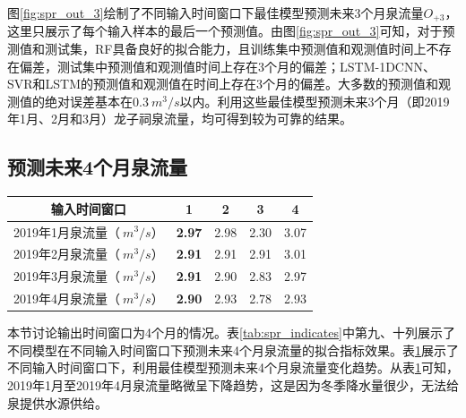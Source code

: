 图\ref{fig:spr_out_3}绘制了不同输入时间窗口下最佳模型预测未来3个月泉流量$O_{+3}$，这里只展示了每个输入样本的最后一个预测值。由图\ref{fig:spr_out_3}可知，对于预测值和测试集，RF具备良好的拟合能力，且训练集中预测值和观测值时间上不存在偏差，测试集中预测值和观测值时间上存在3个月的偏差；LSTM-1DCNN、SVR和LSTM的预测值和观测值在时间上存在3个月的偏差。大多数的预测值和观测值的绝对误差基本在$\SI{0.3}{m^{3}/s}$以内。利用这些最佳模型预测未来3个月（即2019年1月、2月和3月）龙子祠泉流量，均可得到较为可靠的结果。

\subsection{预测未来4个月泉流量}\label{sec:spr_four}

\begin{table}[!htbp]
  \centering
  \label{tab:spr_four}
  \footnotesize
  \begin{tabular}{ccccc}
    \toprule
    输入时间窗口 & 1 & 2 & 3 & 4\\
    \midrule
    2019年1月泉流量（$\SI{}{m^{3}/s}$）& \textbf{2.97} & 2.98 & 2.30 & 3.07 \\
    2019年2月泉流量（$\SI{}{m^{3}/s}$）& \textbf{2.91} & 2.91 & 2.91 & 3.01 \\
    2019年3月泉流量（$\SI{}{m^{3}/s}$）& \textbf{2.91} & 2.90 & 2.83 & 2.97 \\
    2019年4月泉流量（$\SI{}{m^{3}/s}$）& \textbf{2.90} & 2.93 & 2.78 & 2.93 \\
    \bottomrule
  \end{tabular}
\end{table}

本节讨论输出时间窗口为4个月的情况。表\ref{tab:spr_indicates}中第九、十列展示了不同模型在不同输入时间窗口下预测未来4个月泉流量的拟合指标效果。表\ref{tab:spr_four}展示了不同输入时间窗口下，利用最佳模型预测未来4个月泉流量变化趋势。从表\ref{tab:spr_four}可知，2019年1月至2019年4月泉流量略微呈下降趋势，这是因为冬季降水量很少，无法给泉提供水源供给。

